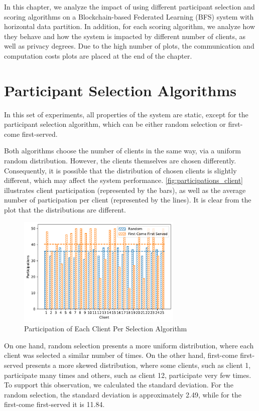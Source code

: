 In this chapter, we analyze the impact of using different participant selection and scoring algorithms on a Blockchain-based Federated Learning (BFS) system with horizontal data partition. In addition, for each scoring algorithm, we analyze how they behave and how the system is impacted by different number of clients, as well as privacy degrees. Due to the high number of plots, the communication and computation costs plots are placed at the end of the chapter.

\section{Participant Selection Algorithms}

In this set of experiments, all properties of the system are static, except for the participant selection algorithm, which can be either random selection or first-come first-served.

Both algorithms choose the number of clients in the same way, via a uniform random distribution. However, the clients themselves are chosen differently. Consequently, it is possible that the distribution of chosen clients is slightly different, which may affect the system performance. \autoref{fig:participations_client} illustrates client participation (represented by the bars), as well as the average number of participation per client (represented by the lines). It is clear from the plot that the distributions are different.

\begin{figure}[!ht]
    \centering
    \centering
    \includegraphics[width=0.7\textwidth]{graphics/selection/clients.pdf}
    \caption{Participation of Each Client Per Selection Algorithm}
    \label{fig:participations_client}
\end{figure}

On one hand, random selection presents a more uniform distribution, where each client was selected a similar number of times. On the other hand, first-come first-served presents a more skewed distribution, where some clients, such as client 1, participate many times and others, such as client 12, participate very few times. To support this observation, we calculated the standard deviation. For the random selection, the standard deviation is approximately 2.49, while for the first-come first-served it is 11.84.

